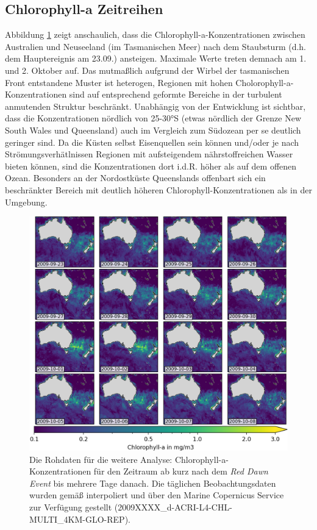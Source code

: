 \documentclass[12pt,a4paper,onecolumn]{scrartcl}
\begin{document}
\subsection{Chlorophyll-a Zeitreihen} \label{sec:chla_zeitreihen}
Abbildung \ref{fig:chla_collage} zeigt anschaulich, dass die Chlorophyll-a-Konzentrationen zwischen Australien und Neuseeland (im Tasmanischen Meer) nach dem Staubsturm (d.h. dem Hauptereignis am 23.09.) ansteigen. Maximale Werte treten demnach am 1. und 2. Oktober auf. Das mutmaßlich aufgrund der Wirbel der tasmanischen Front \citep{Gabric.2016} entstandene Muster ist heterogen, Regionen mit hohen Cholorophyll-a-Konzentrationen sind auf entsprechend geformte Bereiche in der turbulent anmutenden Struktur beschränkt. Unabhängig von der Entwicklung ist sichtbar, dass die Konzentrationen nördlich von 25-30°S (etwas nördlich der Grenze New South Wales und Queensland) auch im Vergleich zum Südozean per se deutlich geringer sind. Da die Küsten selbst Eisenquellen sein können und/oder je nach Strömungsverhätlnissen Regionen mit aufsteigendem nährstoffreichen Wasser bieten können, sind die Konzentrationen dort i.d.R. höher als auf dem offenen Ozean. Besonders an der Nordostküste Queenslands offenbart sich ein beschränkter Bereich mit deutlich höheren Chlorophyll-Konzentrationen als in der Umgebung. 
\begin{figure}
\includegraphics[width=\textwidth]{bilder/chl_collage.png}
\caption{Die Rohdaten für die weitere Analyse: Chlorophyll-a-Konzentrationen für den Zeitraum ab kurz nach dem \textit{Red Dawn Event} bis mehrere Tage danach. Die täglichen Beobachtungsdaten wurden gemäß \cite{Saulquin.2019} interpoliert und über den Marine Copernicus Service zur Verfügung gestellt (2009XXXX_d-ACRI-L4-CHL-MULTI_4KM-GLO-REP).} \label{fig:chla_collage}
\end{figure}
\end{document}
